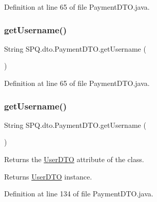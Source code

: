 Definition at line 65 of file Payment\+D\+T\+O.\+java.

\mbox{\label{class_s_p_q_1_1dto_1_1_payment_d_t_o_a31d0edbb3ec64b406e70cd3deaa5ab1a}} 
\subsubsection{\texorpdfstring{get\+Username()}{getUsername()}\hspace{0.1cm}{\footnotesize\ttfamily [2/3]}}
{\footnotesize\ttfamily String S\+P\+Q.\+dto.\+Payment\+D\+T\+O.\+get\+Username (\begin{DoxyParamCaption}{ }\end{DoxyParamCaption})}



Definition at line 65 of file Payment\+D\+T\+O.\+java.

\mbox{\label{class_s_p_q_1_1dto_1_1_payment_d_t_o_a31d0edbb3ec64b406e70cd3deaa5ab1a}} 
\subsubsection{\texorpdfstring{get\+Username()}{getUsername()}\hspace{0.1cm}{\footnotesize\ttfamily [3/3]}}
{\footnotesize\ttfamily String S\+P\+Q.\+dto.\+Payment\+D\+T\+O.\+get\+Username (\begin{DoxyParamCaption}{ }\end{DoxyParamCaption})}

Returns the \mbox{\hyperlink{class_s_p_q_1_1dto_1_1_user_d_t_o}{User\+D\+TO}} attribute of the class. \begin{DoxyReturn}{Returns}
\mbox{\hyperlink{class_s_p_q_1_1dto_1_1_user_d_t_o}{User\+D\+TO}} instance. 
\end{DoxyReturn}


Definition at line 134 of file Payment\+D\+T\+O.\+java.

